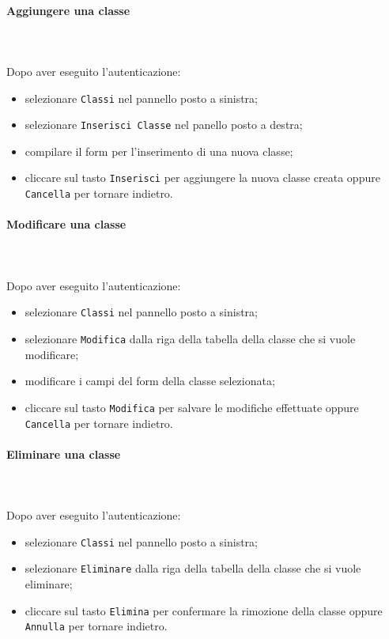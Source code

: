 	\paragraph{Aggiungere una classe} \mbox{}\\ \mbox{}\\
	Dopo aver eseguito l'autenticazione:
	\begin{itemize}
		\item selezionare \texttt{Classi} nel pannello posto a sinistra;
		\item selezionare \texttt{Inserisci Classe} nel panello posto a destra;
		\item compilare il form per l'inserimento di una nuova classe;
		\item cliccare sul tasto \texttt{Inserisci} per aggiungere la nuova classe 
		creata oppure \texttt{Cancella} per tornare indietro.	
	\end{itemize}
	
	\paragraph{Modificare una classe} \mbox{}\\ \mbox{}\\
	Dopo aver eseguito l'autenticazione:
	\begin{itemize}
		\item selezionare \texttt{Classi} nel pannello posto a sinistra;
		\item selezionare \texttt{Modifica} dalla riga della tabella della classe
		che si vuole modificare;
		\item modificare i campi del form della classe selezionata;
		\item cliccare sul tasto \texttt{Modifica} per salvare le modifiche effettuate
		oppure \texttt{Cancella} per tornare indietro.
	\end{itemize}
	
	\paragraph{Eliminare una classe} \mbox{}\\ \mbox{}\\
	Dopo aver eseguito l'autenticazione:
	\begin{itemize}
		\item selezionare \texttt{Classi} nel pannello posto a sinistra;
		\item selezionare \texttt{Eliminare} dalla riga della tabella della classe
		che si vuole eliminare;
		\item cliccare sul tasto \texttt{Elimina} per confermare la rimozione della classe
		oppure \texttt{Annulla} per tornare indietro.
	\end{itemize}
	
